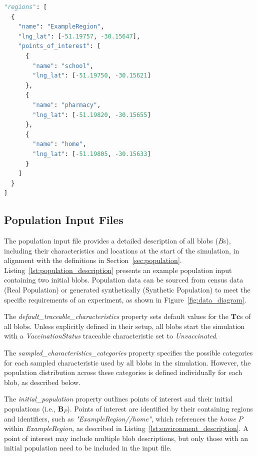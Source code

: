 \documentclass[pdflatex,sn-mathphys-num]{sn-jnl}%
\theoremstyle{thmstyleone}%
\theoremstyle{thmstyletwo}%
\theoremstyle{thmstylethree}%
\begin{document}
\begin{appendices}
\begin{lstlisting}[language={python},
caption={Example of an environment input file.},
captionpos=b, label={lst:environment_description}, basicstyle=\footnotesize]
"regions": [ 
  {
    "name": "ExampleRegion",
    "lng_lat": [-51.19757, -30.15647],
    "points_of_interest": [
      { 
        "name": "school",
        "lng_lat": [-51.19750, -30.15621]
      },
      { 
        "name": "pharmacy",
        "lng_lat": [-51.19820, -30.15655]
      },
      { 
        "name": "home",
        "lng_lat": [-51.19805, -30.15633]
      }
    ]
  } 
]
\end{lstlisting}

\subsection{Population Input Files}
\label{app:input_population}

The population input file provides a detailed description of all blobs ($B$s), including their characteristics and locations at the start of the simulation, in alignment with the definitions in Section~\ref{sec:population}. Listing~\ref{lst:population_description} presents an example population input containing two initial blobs. Population data can be sourced from census data (Real Population) or generated synthetically (Synthetic Population) to meet the specific requirements of an experiment, as shown in Figure~\ref{fig:data_diagram}.

The \textit{default\_traceable\_characteristics} property sets default values for the $\bm{Tc}$s of all blobs. Unless explicitly defined in their setup, all blobs start the simulation with a \textit{VaccinationStatus} traceable characteristic set to \textit{Unvaccinated}.

The \textit{sampled\_characteristics\_categories} property specifies the possible categories for each sampled characteristic used by all blobs in the simulation. However, the population distribution across these categories is defined individually for each blob, as described below.

The \textit{initial\_population} property outlines points of interest and their initial populations (i.e., $\bm{B}_{P}$). Points of interest are identified by their containing regions and identifiers, such as \textit{"ExampleRegion//home"}, which references the \textit{home} $P$ within \textit{ExampleRegion}, as described in Listing~\ref{lst:environment_description}. A point of interest may include multiple blob descriptions, but only those with an initial population need to be included in the input file.


\end{appendices}
\end{document}
